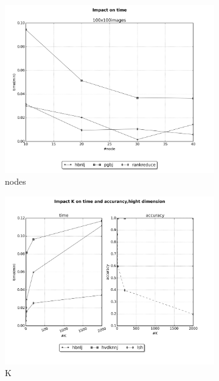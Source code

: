 \documentclass[10pt,a4paper]{article}
\begin{document}
  \begin{figure}[ht]
 \centering
 	  \begin{subfigure}[b]{0.3\textwidth}
                 \includegraphics[width=\textwidth]{../graph/surf/nodes.png} 
                \caption{nodes}
        \end{subfigure}%
        \begin{subfigure}[b]{0.3\textwidth}
                 \includegraphics[width=\textwidth]{../graph/surf/K.png} 
                \caption{K}
        \end{subfigure}%
        \begin{subfigure}[b]{0.3\textwidth}

\end{subfigure}
\end{figure}
\end{document}
